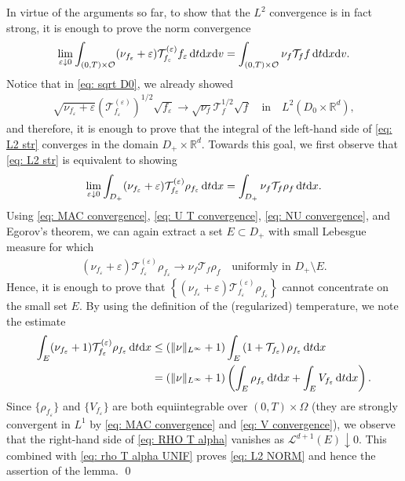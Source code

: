 \documentclass[10pt, reqno]{amsart}
\theoremstyle{plain}
\theoremstyle{definition}
\theoremstyle{remark}
\renewenvironment{proof}[1][\proofname]{\noindent{\scshape #1.\quad}}{\qed}
\numberwithin{equation}{section}
\newcommand{\calO}{\mathcal O}
\newcommand{\calT}{\mathcal T}
\newcommand{\scrL}{\mathscr L}
\newcommand{\R}{\mathbb{R}}
\newcommand{\ve}{\varepsilon}
\newcommand{\dx}{\textnormal{d}x}
\newcommand{\dv}{\textnormal{d}v}
\newcommand{\dt}{\textnormal{d}t}
\newcommand{\lt}{\left}
\newcommand{\rt}{\right}
\begin{document}
\begin{proof}
    In virtue of the arguments so far, to show that the $L^2$ convergence is in fact strong, it is enough to prove the norm convergence
    \begin{align}\label{eq: L2 str}
        \lim_{\ve\downarrow 0} \int_{(0,T)\times \calO} (\nu_{f_\ve} + \ve) \calT_{f_\ve}^{(\ve)} f_\ve \,\dt\dx\dv = \int_{(0,T)\times \calO} \nu_f \calT_f f \,\dt\dx\dv.
    \end{align}
    Notice that in \eqref{eq: sqrt D0}, we already showed
    \begin{align*}
        \sqrt{\nu_{f_\ve} + \ve} \lt(\calT_{f_\ve}^{(\ve)}\rt)^{1/2} \sqrt{f_\ve} \to \sqrt{\nu_f} \calT_f^{1/2} \sqrt{f} \quad \text{in} \quad L^2(D_0\times \R^d), 
    \end{align*}
    and therefore, it is enough to prove that the integral of the left-hand side of \eqref{eq: L2 str} converges in the domain $D_+\times\R^d$.
    Towards this goal, we first observe that \eqref{eq: L2 str} is equivalent to showing
    \begin{align}\label{eq: L2 NORM}
        \lim_{\ve\downarrow 0} \int_{D_+} (\nu_{f_\ve} + \ve) \calT_{f_\ve}^{(\ve)} \rho_{f_\ve} \,\dt\dx = \int_{D_+} \nu_f \calT_f \rho_f \,\dt\dx.
    \end{align}
    Using \eqref{eq: MAC convergence}, \eqref{eq: U T convergence}, \eqref{eq: NU convergence}, and Egorov's theorem, we can again extract a set $E\subset D_+$ with small Lebesgue measure for which 
    \begin{align}\label{eq: rho T alpha UNIF}
        (\nu_{f_\ve} + \ve) \calT_{f_\ve}^{(\ve)} \rho_{f_\ve} \to \nu_f \calT_f \rho_f \quad \text{uniformly in $D_+\setminus E$}.
    \end{align}
    Hence, it is enough to prove that $\lt\{(\nu_{f_\ve} + \ve)\calT_{f_\ve}^{(\ve)} \rho_{f_\ve} \rt\}$ cannot concentrate on the small set $E$. By using the definition of the (regularized) temperature, we note  the estimate
    \begin{equation} \label{eq: RHO T alpha}
    \begin{split}
        \int_E (\nu_{f_\ve} + 1) \calT_{f_\ve}^{(\ve)} \rho_{f_\ve} \,\dt\dx &\le (\|\nu\|_{L^\infty} + 1) \int_E \lt(1 + \calT_{f_\ve}\rt) \rho_{f_\ve} \,\dt\dx \\
        &= (\|\nu\|_{L^\infty}+1) \lt(\int_E \rho_{f_\ve} \,\dt\dx +  \int_E V_{f_\ve} \,\dt\dx \rt).
    \end{split}
    \end{equation}
    Since $\{\rho_{f_\ve}\}$ and $\{V_{f_\ve}\}$ are both equiintegrable over $(0,T)\times \Omega$ (they are strongly convergent in $L^1$ by \eqref{eq: MAC convergence} and \eqref{eq: V convergence}), we observe that the right-hand side of \eqref{eq: RHO T alpha} vanishes as $\scrL^{d+1}(E) \downarrow 0$. This combined with \eqref{eq: rho T alpha UNIF} proves \eqref{eq: L2 NORM} and hence the assertion of the lemma.
\end{proof}
\end{document}
